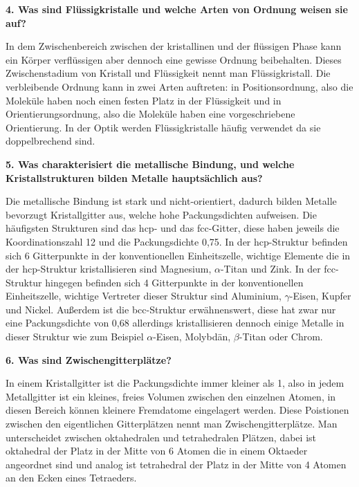 \noindent\textbf{4. Was sind Flüssigkristalle und welche Arten von Ordnung weisen sie auf?}\\
\begin{addmargin}[25pt]{0pt}     
In dem Zwischenbereich zwischen der kristallinen und der flüssigen Phase kann ein Körper verflüssigen aber dennoch eine gewisse Ordnung beibehalten. Dieses Zwischenstadium von Kristall und Flüssigkeit nennt man Flüssigkristall. Die verbleibende Ordnung kann in zwei Arten auftreten: in Positionsordnung, also die Moleküle haben noch einen festen Platz in der Flüssigkeit und in Orientierungsordnung, also die Moleküle haben eine vorgeschriebene Orientierung. In der Optik werden Flüssigkristalle häufig verwendet da sie doppelbrechend sind.\\
\end{addmargin}

\noindent\textbf{5. Was charakterisiert die metallische Bindung, und welche Kristallstrukturen bilden Metalle hauptsächlich aus?}\\
\begin{addmargin}[25pt]{0pt}     
Die metallische Bindung ist stark und nicht-orientiert, dadurch bilden Metalle bevorzugt Kristallgitter aus, welche hohe Packungsdichten aufweisen. Die häufigsten Strukturen sind das hcp- und das fcc-Gitter, diese haben jeweils die Koordinationszahl 12 und die Packungsdichte 0,75. In der hcp-Struktur befinden sich 6 Gitterpunkte in der konventionellen Einheitszelle, wichtige Elemente die in der hcp-Struktur kristallisieren sind Magnesium, $\alpha$-Titan und Zink. In der fcc-Struktur hingegen befinden sich 4 Gitterpunkte in der konventionellen Einheitszelle, wichtige Vertreter dieser Struktur sind Aluminium, $\gamma$-Eisen, Kupfer und Nickel. Außerdem ist die bcc-Struktur erwähnenswert, diese hat zwar nur eine Packungsdichte von 0,68 allerdings kristallisieren dennoch einige Metalle in dieser Struktur wie zum Beispiel $\alpha$-Eisen, Molybdän, $\beta$-Titan oder Chrom. \\
\end{addmargin}

\noindent\textbf{6. Was sind Zwischengitterplätze?}\\
\begin{addmargin}[25pt]{0pt}    
In einem Kristallgitter ist die Packungsdichte immer kleiner als 1, also in jedem Metallgitter ist ein kleines, freies Volumen zwischen den einzelnen Atomen, in diesen Bereich können kleinere Fremdatome eingelagert werden. Diese Poistionen zwischen den eigentlichen Gitterplätzen nennt man Zwischengitterplätze. Man unterscheidet zwischen oktahedralen und tetrahedralen Plätzen, dabei ist oktahedral der Platz in der Mitte von 6 Atomen die in einem Oktaeder angeordnet sind und analog ist tetrahedral der Platz in der Mitte von 4 Atomen an den Ecken eines Tetraeders.\\
\end{addmargin}

